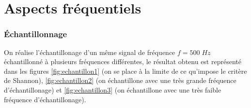 \documentclass[french]{article}
\begin{document}
\FloatBarrier
\newpage
\clearpage
\part{Aspects fréquentiels}

\section{Échantillonnage}
On réalise l'échantillonage d'un même signal de fréquence $f=500 \; Hz$ échantillonné à plusieurs fréquences différentes, le résultat obtenu est représenté dans les figures \ref{fig:echantillon1} (on se place à la limite de ce qu'impose le critère de Shannon), \ref{fig:echantillon2} (on échantillone avec une très grande fréquence d'échantillonage) et \ref{fig:echantillon3} (on échantillone avec une très faible fréquence d'échantillonage).
\end{document}

